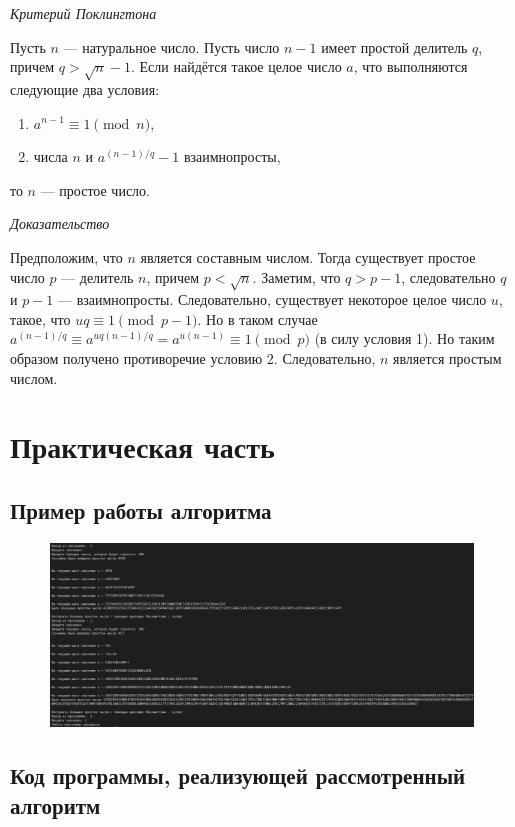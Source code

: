 \documentclass[bachelor, och, labwork]{shiza}
\begin{document}
\begin{center}
    \textit {Критерий Поклингтона}
\end{center}

Пусть $n$ --- натуральное число. Пусть число $n-1$ имеет простой делитель $q$, 
причем $q>{\sqrt {n}}-1$. Если найдётся такое целое число $a$, что выполняются 
следующие два условия:

\begin{enumerate}
    \item $a^{n-1} \equiv 1 \pmod n$,
    \item числа $n$ и $a^{(n-1)/q}-1$ взаимнопросты,
\end{enumerate}

то $n$ --- простое число.

\begin{center}
    \textit {Доказательство}
\end{center}

Предположим, что $n$ является составным числом. Тогда существует простое число
$p$ --- делитель $n$, причем $p<{\sqrt {n}}$. Заметим, что $q>p-1$, следовательно
$q$ и $p-1$ --- взаимнопросты. Следовательно, существует некоторое целое число 
$u$, такое, что $uq\equiv 1{\pmod {p-1}}$. Но в таком случае 
$a^{(n-1)/q}\equiv a^{uq(n-1)/q}=a^{u(n-1)}\equiv 1{\pmod {p}}$ (в силу условия 1). 
Но таким образом получено противоречие условию 2. Следовательно, $n$ является 
простым числом.



\section{Практическая часть}
\subsection{Пример работы алгоритма}
\begin{figure}[H]
    \centering
    \includegraphics[width=1\textwidth]{pic1.png}
    \caption{}
\end{figure}

    \subsection{Код программы, реализующей рассмотренный алгоритм}
        \inputminted{python}{lab10.py}
\end{document}
